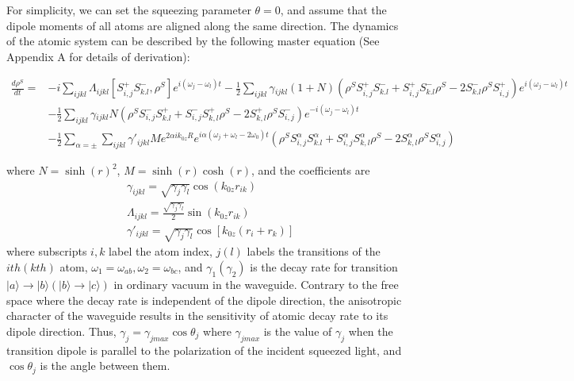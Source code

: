\documentclass[aps,showpacs,twocolumn,twoside,groupedaddress]{revtex4}
\begin{document}
For simplicity, we can set the squeezing parameter $\theta=0$, and assume that the dipole moments of all atoms are aligned along the same direction. The dynamics of the atomic system can be described by the following master equation (See Appendix A for details of derivation):
\begin{widetext}
\begin{equation}
\label{eq1}
\begin{split}
\frac{d\rho^{S}}{dt}=&-i\underset{ijkl}{\sum}\Lambda_{ijkl}[S_{i,j}^{+}S_{k.l}^{-},\rho^{S}]e^{i(\omega_{j}-\omega_{l})t}-\frac{1}{2}\underset{ijkl}{\sum}\gamma{}_{ijkl}(1+N)(\rho^{S}S_{i,j}^{+}S_{k.l}^{-}+S_{i,j}^{+}S_{k.l}^{-}\rho^{S}-2S_{k.l}^{-}\rho^{S}S_{i,j}^{+})e^{i(\omega_{j}-\omega_{l})t}\\
&-\frac{1}{2}\underset{ijkl}{\sum}\gamma{}_{ijkl}N(\rho^{S}S_{i,j}^{-}S_{k.l}^{+}+S_{i,j}^{-}S_{k,l}^{+}\rho^{S}-2S_{k,l}^{+}\rho^{S}S_{i,j}^{-})e^{-i(\omega_{j}-\omega_{l})t}\\
&-\frac{1}{2}\sum_{\alpha=\pm}\underset{ijkl}{\sum}\gamma'_{ijkl}Me^{2\alpha ik_{0z}R}e^{i\alpha(\omega_{j}+\omega_{l}-2\omega_{0})t}(\rho^{S}S_{i,j}^{\alpha}S_{k.l}^{\alpha}+S_{i,j}^{\alpha}S_{k,l}^{\alpha}\rho^{S}-2S_{k,l}^{\alpha}\rho^{S}S_{i,j}^{\alpha})
\end{split}
\end{equation}
\end{widetext}
where $N=\sinh(r)^2$, $M=\sinh(r)\cosh(r)$, and the coefficients are
\begin{equation}
\label{eq2}
\begin{split}
& \gamma_{ijkl}=\sqrt{\gamma_{j}\gamma_{l}}\cos(k_{0z}r_{ik}) \\
& \Lambda_{ijkl}=\frac{\sqrt{\gamma_{j}\gamma_{l}}}{2}\sin(k_{0z}r_{ik})\\
& \gamma'_{ijkl}=\sqrt{\gamma_{j}\gamma_{l}}\cos[k_{0z}(r_{i}+r_{k})]
\end{split}
\end{equation}
where subscripts $i,k$ label the atom index, $j(l)$ labels the transitions of the $ith (kth)$ atom, $\omega_1=\omega_{ab}, \omega_2=\omega_{bc}$, and $\gamma_{1}(\gamma_{2})$ is the decay rate for transition $|a\rangle\rightarrow|b\rangle(|b\rangle\rightarrow|c\rangle)$ in ordinary vacuum in the waveguide. Contrary to the free space where the decay rate is independent of the dipole direction, the anisotropic character of the waveguide results in the sensitivity of atomic decay rate to its dipole direction. Thus, $\gamma_j=\gamma_{jmax}\cos\theta_j$ where $\gamma_{jmax}$ is the value of $\gamma_{j}$ when the transition dipole is parallel to the polarization of the incident squeezed light, and $\cos\theta_j$ is the angle between them.
\end{document}
